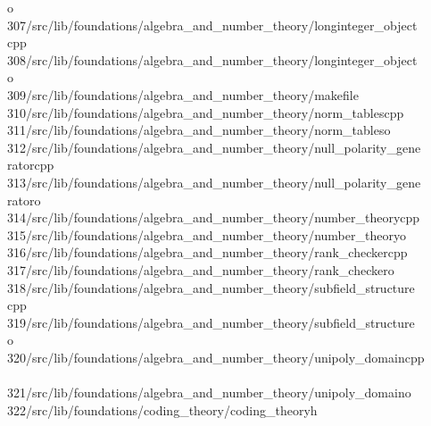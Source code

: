 \begin{tabbing}
\>o\\[0pt]
307\>/src/lib/foundations/algebra\_and\_number\_theory/longinteger\_object\\[0pt]
\>cpp\\[0pt]
308\>/src/lib/foundations/algebra\_and\_number\_theory/longinteger\_object\\[0pt]
\>o\\[0pt]
309\>/src/lib/foundations/algebra\_and\_number\_theory/makefile\\[0pt]
310\>/src/lib/foundations/algebra\_and\_number\_theory/norm\_tablescpp\\[0pt]
311\>/src/lib/foundations/algebra\_and\_number\_theory/norm\_tableso\\[0pt]
312\>/src/lib/foundations/algebra\_and\_number\_theory/null\_polarity\_gene\\[0pt]
\>ratorcpp\\[0pt]
313\>/src/lib/foundations/algebra\_and\_number\_theory/null\_polarity\_gene\\[0pt]
\>ratoro\\[0pt]
314\>/src/lib/foundations/algebra\_and\_number\_theory/number\_theorycpp\\[0pt]
315\>/src/lib/foundations/algebra\_and\_number\_theory/number\_theoryo\\[0pt]
316\>/src/lib/foundations/algebra\_and\_number\_theory/rank\_checkercpp\\[0pt]
317\>/src/lib/foundations/algebra\_and\_number\_theory/rank\_checkero\\[0pt]
318\>/src/lib/foundations/algebra\_and\_number\_theory/subfield\_structure\\[0pt]
\>cpp\\[0pt]
319\>/src/lib/foundations/algebra\_and\_number\_theory/subfield\_structure\\[0pt]
\>o\\[0pt]
320\>/src/lib/foundations/algebra\_and\_number\_theory/unipoly\_domaincpp\\[0pt]
\>\\[0pt]
321\>/src/lib/foundations/algebra\_and\_number\_theory/unipoly\_domaino\\[0pt]
322\>/src/lib/foundations/coding\_theory/coding\_theoryh\\[0pt]

\end{tabbing}
